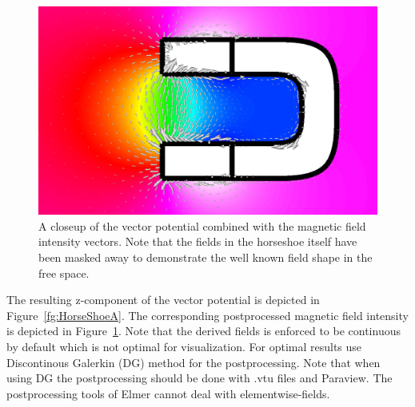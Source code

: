\begin{figure}[h]
\centering
\includegraphics[width=120 mm]{HorseShoeB}
\caption{A closeup of the vector potential combined with the magnetic field intensity vectors. 
Note that the fields in the horseshoe itself have been
masked away to demonstrate the well known field shape in the free space.}\label{fg:HorseShoeB}
\end{figure}  


The resulting z-component of the vector potential is depicted in Figure~\ref{fg:HorseShoeA}.
The corresponding postprocessed magnetic field intensity is depicted in Figure~\ref{fg:HorseShoeB}. 
Note that the derived fields is enforced to be continuous by default which is not 
optimal for visualization. For optimal results use Discontinous Galerkin (DG) method
for the postprocessing. Note that when using DG the postprocessing should be done with .vtu files and 
Paraview. The postprocessing tools of Elmer cannot deal with elementwise-fields. 
